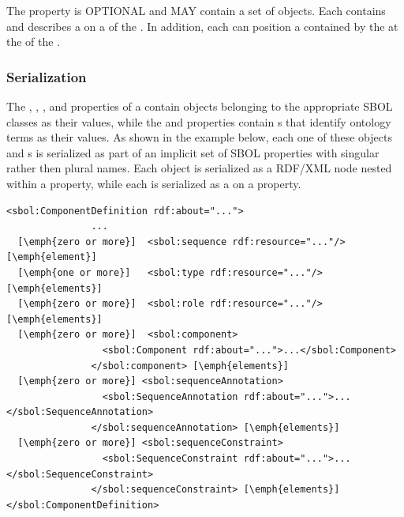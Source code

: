The  property is OPTIONAL and MAY contain a set of  objects. Each  contains and describes a  on a  of the . In addition, each  can  position a  contained by the  at the  of the .

\subsubsection*{Serialization}
The , ,  , and  properties of a  contain objects belonging to the appropriate SBOL classes as their values, while the  and  properties contain s that identify ontology terms as their values. As shown in the example below, each one of these objects and s is serialized as part of an implicit set of SBOL properties with singular rather then plural names. Each object is serialized as a RDF/XML node nested within a property, while each  is serialized as a  on a property.

\begin{lstlisting}
<sbol:ComponentDefinition rdf:about="...">
               ...
  [\emph{zero or more}]  <sbol:sequence rdf:resource="..."/> [\emph{element}]
  [\emph{one or more}]   <sbol:type rdf:resource="..."/> [\emph{elements}]
  [\emph{zero or more}]  <sbol:role rdf:resource="..."/> [\emph{elements}]    
  [\emph{zero or more}]  <sbol:component>
                 <sbol:Component rdf:about="...">...</sbol:Component>
               </sbol:component> [\emph{elements}]
  [\emph{zero or more}] <sbol:sequenceAnnotation>
                 <sbol:SequenceAnnotation rdf:about="...">...</sbol:SequenceAnnotation>
               </sbol:sequenceAnnotation> [\emph{elements}]        
  [\emph{zero or more}] <sbol:sequenceConstraint>
                 <sbol:SequenceConstraint rdf:about="...">...</sbol:SequenceConstraint>
               </sbol:sequenceConstraint> [\emph{elements}]        
</sbol:ComponentDefinition>
\end{lstlisting}


